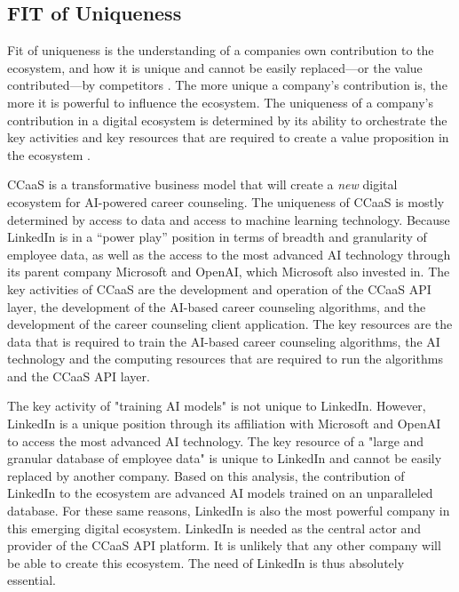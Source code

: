 \subsection{FIT of Uniqueness}

Fit of uniqueness is the understanding of a companies own contribution to the ecosystem, and how it is unique
and cannot be easily replaced---or the value contributed---by competitors \citep[p.~53]{griederDigitalEcosystemHow2019}.
The more unique a company's contribution is, the more it is powerful to influence the ecosystem. The uniqueness of a company's
contribution in a digital ecosystem is determined by its ability to orchestrate the key activities and key resources 
that are required to create a value proposition in the ecosystem \citep[p.~201]{schwafertsLectureStrategicBusiness2023}.

CCaaS is a transformative business model that will create a \textit{new} digital ecosystem for
AI-powered career counseling. The uniqueness of CCaaS is mostly determined by access to data and 
access to machine learning technology. Because LinkedIn is in a ``power play'' position in terms 
of breadth and granularity of employee data, as well as the access to the most advanced AI technology 
through its parent company Microsoft and OpenAI, which Microsoft also invested in.
The key activities of CCaaS are the development and operation of the CCaaS API layer, the development
of the AI-based career counseling algorithms, and the development of the career counseling client
application. The key resources are the data that is required to train the AI-based career counseling
algorithms, the AI technology and the computing resources that are required to run the algorithms and
the CCaaS API layer.

The key activity of "training AI models" is not unique to LinkedIn. However, LinkedIn is a unique position 
through its affiliation with Microsoft and OpenAI to access the most advanced AI technology. The key resource 
of a "large and granular database of employee data" is unique to LinkedIn and cannot be easily replaced by
another company. Based on this analysis, the contribution of LinkedIn to the ecosystem are advanced AI models 
trained on an unparalleled database. For these same reasons, LinkedIn is also the most powerful company in this
emerging digital ecosystem. LinkedIn is needed as the central actor and provider of the CCaaS API platform. It
is unlikely that any other company will be able to create this ecosystem. The need of LinkedIn is thus absolutely
essential.

